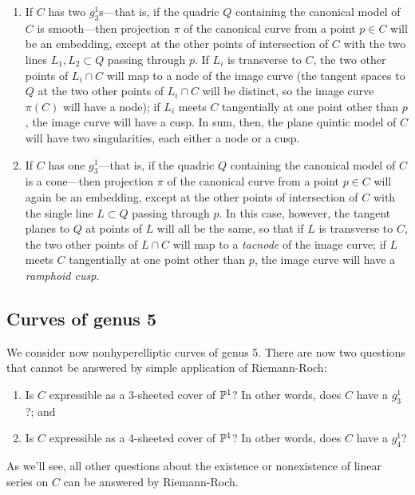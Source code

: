 \documentclass[12pt, leqno]{article}
\begin{document}
\begin{enumerate}
\item If $C$ has two $g^1_3$s---that is, if the quadric $Q$ containing the canonical model of $C$ is smooth---then projection $\pi$ of the canonical curve from a point $p \in C$ will be an embedding, except at the  other points of intersection of $C$ with the two lines $L_1, L_2 \subset Q$ passing through $p$. If $L_i$ is transverse to $C$, the two other points of $L_i \cap C$ will map to a node of the image curve (the tangent spaces to $Q$ at the two other points of $L_i \cap C$ will be distinct, so the image curve $\pi(C)$ will have a node); if $L_i$ meets $C$ tangentially at one point other than $p$, the image curve will have a cusp. In sum, then, the plane quintic model of $C$ will have two singularities, each either a node or a cusp.
\item If $C$ has one $g^1_3$---that is, if the quadric $Q$ containing the canonical model of $C$ is a cone---then projection $\pi$ of the canonical curve from a point $p \in C$ will again be an embedding, except at the  other points of intersection of $C$ with the single line $L \subset Q$ passing through $p$. In this case, however, the tangent planes to $Q$ at points of $L$ will all be the same, so that if $L$ is transverse to $C$, the two other points of $L \cap C$ will map to a \emph{tacnode} of the image curve; if $L$ meets $C$ tangentially at one point other than $p$, the image curve will have a \emph{ramphoid cusp}.
\end{enumerate}


\subsection{Curves of genus 5}

We consider now nonhyperelliptic curves of genus 5. There are now two questions that cannot be answered by simple application of Riemann-Roch:

\begin{enumerate}
\item Is $C$ expressible as a 3-sheeted cover of ${\mathbb P}^1$? In other words, does $C$ have a $g^1_3$?; and
\item Is $C$ expressible as a 4-sheeted cover of ${\mathbb P}^1$? In other words, does $C$ have a $g^1_4$?
\end{enumerate}

As we'll see, all other questions about the existence or nonexistence of linear series on $C$ can be answered by Riemann-Roch.
\end{document}
